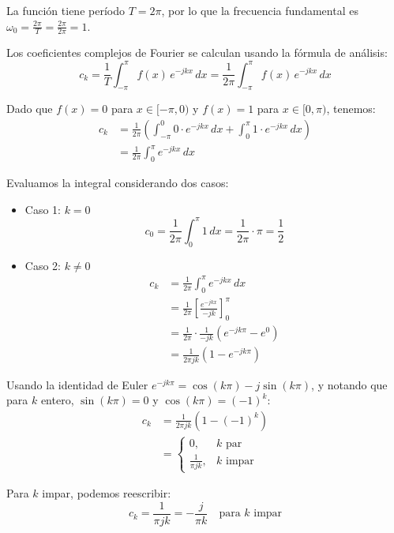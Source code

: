 \documentclass[
  11pt,
  letterpaper,
   addpoints,
   answers
  ]{exam}
\begin{document}
\begin{questions}
\begin{solution}
La función tiene período \(T = 2\pi\), por lo que la frecuencia fundamental es \(\omega_0 = \frac{2\pi}{T} = \frac{2\pi}{2\pi} = 1\).

Los coeficientes complejos de Fourier se calculan usando la fórmula de análisis:
\begin{equation}
c_k = \frac{1}{T}\int_{-\pi}^{\pi} f(x)\,e^{-jkx}\,dx = \frac{1}{2\pi}\int_{-\pi}^{\pi} f(x)\,e^{-jkx}\,dx
\end{equation}

Dado que \(f(x) = 0\) para \(x \in [-\pi, 0)\) y \(f(x) = 1\) para \(x \in [0, \pi)\), tenemos:
\begin{align}
c_k &= \frac{1}{2\pi}\left(\int_{-\pi}^{0} 0 \cdot e^{-jkx}\,dx + \int_{0}^{\pi} 1 \cdot e^{-jkx}\,dx\right) \\
&= \frac{1}{2\pi}\int_{0}^{\pi} e^{-jkx}\,dx
\end{align}

Evaluamos la integral considerando dos casos:
\begin{itemize}
\item Caso 1: \(k = 0\)
\begin{equation}
c_0 = \frac{1}{2\pi}\int_{0}^{\pi} 1\,dx = \frac{1}{2\pi} \cdot \pi = \frac{1}{2}
\end{equation}

\item Caso 2: \(k \neq 0\)
\begin{align}
c_k &= \frac{1}{2\pi}\int_{0}^{\pi} e^{-jkx}\,dx \\
&= \frac{1}{2\pi}\left[\frac{e^{-jkx}}{-jk}\right]_{0}^{\pi} \\
&= \frac{1}{2\pi} \cdot \frac{1}{-jk}\left(e^{-jk\pi} - e^{0}\right) \\
&= \frac{1}{2\pi jk}\left(1 - e^{-jk\pi}\right)
\end{align}
\end{itemize}
Usando la identidad de Euler \(e^{-jk\pi} = \cos(k\pi) - j\sin(k\pi)\), y notando que para \(k\) entero, \(\sin(k\pi) = 0\) y \(\cos(k\pi) = (-1)^k\):
\begin{align}
c_k &= \frac{1}{2\pi jk}\left(1 - (-1)^k\right) \\
&= \begin{cases}
0, & k \text{ par} \\
\frac{1}{\pi jk}, & k \text{ impar}
\end{cases}
\end{align}

Para \(k\) impar, podemos reescribir:
\begin{equation}
c_k = \frac{1}{\pi jk} = -\frac{j}{\pi k} \quad \text{para } k \text{ impar}
\end{equation}


\end{solution}
\end{questions}
\end{document}

